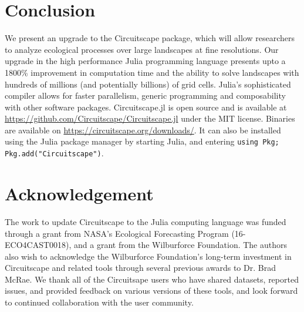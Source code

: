 \documentclass{juliacon}
\begin{document}

\section{Conclusion}
We present an upgrade to the Circuitscape package, which will allow researchers to analyze ecological processes over large landscapes at fine resolutions. Our upgrade in the high performance Julia programming language presents upto a 1800\% improvement in computation time and the ability to solve landscapes with hundreds of millions (and potentially billions) of grid cells. Julia’s sophisticated compiler allows for faster parallelism, generic programming and composability with other software packages. Circuitscape.jl is open source and is available at \url{https://github.com/Circuitscape/Circuitscape.jl} under the MIT license. Binaries are available on \url{https://circuitscape.org/downloads/}. It can also be installed using the Julia package manager by starting Julia, and entering \texttt{using Pkg; Pkg.add("Circuitscape")}. 

\section{Acknowledgement}
The work to update Circuitscape to the Julia computing language was funded through a grant from NASA’s Ecological Forecasting Program (16-ECO4CAST0018), and a grant from the Wilburforce Foundation.  The authors also wish to acknowledge the Wilburforce Foundation’s long-term investment in Circuitscape and related tools through several previous awards to Dr. Brad McRae.  We thank all of the Circuitsape users who have shared datasets, reported issues, and provided feedback on various versions of these tools, and look forward to continued collaboration with the user community. 

% 
\end{document}
